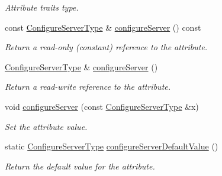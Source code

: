 \begin{DoxyCompactItemize}
\begin{DoxyCompactList}\small\item\em Attribute traits type. \item\end{DoxyCompactList}\item 
const \hyperlink{classopenstack_1_1xml_1_1ShareIp_af9b6ca81de82217c6f2d6cc93182b81c}{ConfigureServerType} \& \hyperlink{classopenstack_1_1xml_1_1ShareIp_a84f588351ece0b66bf977eca400bcb93}{configureServer} () const 
\begin{DoxyCompactList}\small\item\em Return a read-\/only (constant) reference to the attribute. \item\end{DoxyCompactList}\item 
\hyperlink{classopenstack_1_1xml_1_1ShareIp_af9b6ca81de82217c6f2d6cc93182b81c}{ConfigureServerType} \& \hyperlink{classopenstack_1_1xml_1_1ShareIp_ab1021fe0e93728a9dab2158120e5f88c}{configureServer} ()
\begin{DoxyCompactList}\small\item\em Return a read-\/write reference to the attribute. \item\end{DoxyCompactList}\item 
void \hyperlink{classopenstack_1_1xml_1_1ShareIp_a488cf10e9c1f27aaf585579bb35e130d}{configureServer} (const \hyperlink{classopenstack_1_1xml_1_1ShareIp_af9b6ca81de82217c6f2d6cc93182b81c}{ConfigureServerType} \&x)
\begin{DoxyCompactList}\small\item\em Set the attribute value. \item\end{DoxyCompactList}\item 
static \hyperlink{classopenstack_1_1xml_1_1ShareIp_af9b6ca81de82217c6f2d6cc93182b81c}{ConfigureServerType} \hyperlink{classopenstack_1_1xml_1_1ShareIp_ad2d1e78ae9efd1caa37032f4842b02bf}{configureServerDefaultValue} ()
\begin{DoxyCompactList}\small\item\em Return the default value for the attribute. \item\end{DoxyCompactList}\end{DoxyCompactItemize}
